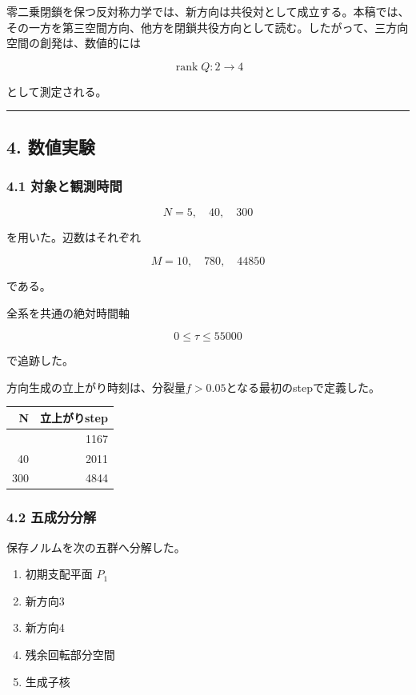 \documentclass[
  a4paper,
]{ltjsarticle}
\newcounter{none} %
\providecommand{\tightlist}{%
  \setlength{\itemsep}{0pt}\setlength{\parskip}{0pt}}
\begin{document}
零二乗閉鎖を保つ反対称力学では、新方向は共役対として成立する。本稿では、その一方を第三空間方向、他方を閉鎖共役方向として読む。したがって、三方向空間の創発は、数値的には

\[
\boxed{
\operatorname{rank}Q:2\longrightarrow4
}
\]

として測定される。

\begin{center}\rule{0.5\linewidth}{0.5pt}\end{center}

\subsection{4. 数値実験}\label{ux6570ux5024ux5b9fux9a13}

\subsubsection{4.1
対象と観測時間}\label{ux5bfeux8c61ux3068ux89b3ux6e2cux6642ux9593}

\[
N=5,\quad40,\quad300
\]

を用いた。辺数はそれぞれ

\[
M=10,\quad780,\quad44850
\]

である。

全系を共通の絶対時間軸

\[
0\le\tau\le55000
\]

で追跡した。

方向生成の立上がり時刻は、分裂量\(f>0.05\)となる最初のstepで定義した。

{\def\LTcaptype{none} %
\begin{longtable}[]{@{}rr@{}}
\toprule\noalign{}
N & 立上がりstep \\
\midrule\noalign{}
\endhead
\bottomrule\noalign{}
\endlastfoot
5 & 1167 \\
40 & 2011 \\
300 & 4844 \\
\end{longtable}
}

\subsubsection{4.2 五成分分解}\label{ux4e94ux6210ux5206ux5206ux89e3}

保存ノルムを次の五群へ分解した。

\begin{enumerate}
\def\labelenumi{\arabic{enumi}.}
\tightlist
\item
  初期支配平面 \(P_1\)
\item
  新方向3
\item
  新方向4
\item
  残余回転部分空間
\item
  生成子核
\end{enumerate}
\end{document}
